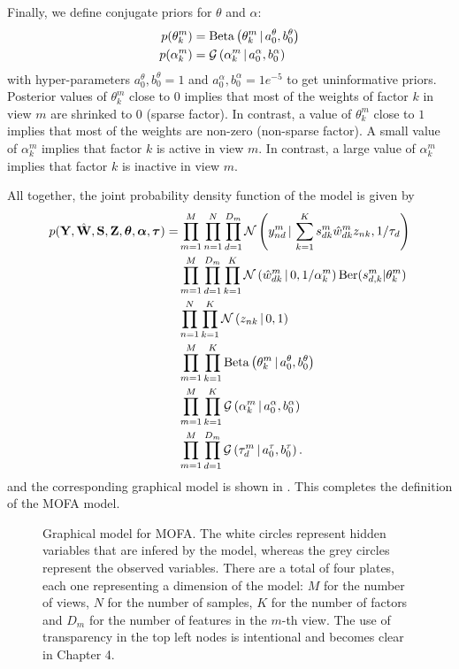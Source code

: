 Finally, we define conjugate priors for $\theta$ and $\alpha$:
\begin{align}
	p(\theta_k^m) &= \text{Beta}\left(\theta_k^m \,|\, a_0^\theta,b_0^\theta\right)\\
	p(\alpha_k^m) &= \mathcal{G}\left(\alpha_k^m \,|\, a_0^\alpha, b_0^\alpha\right)
\end{align}
with hyper-parameters $a_0^\theta,b_0^\theta =1$ and $a_0^\alpha, b_0^\alpha=1e^{-5}$ to get uninformative priors. Posterior values of $\theta_k^m$ close to $0$ implies that most of the weights of factor $k$ in view $m$ are shrinked to $0$ (sparse factor). In contrast, a value of $\theta_k^m$ close to $1$ implies that most of the weights are non-zero (non-sparse factor). A small value of $\alpha_k^m$ implies that factor $k$ is active in view $m$. In contrast, a large value of $\alpha_k^m$ implies that factor $k$ is inactive in view $m$.

All together, the joint probability density function of the model is given by
\begin{align}
	\begin{split}
	p({\bf Y},\hat{{\bf W}},{\bf S},{\bf Z},\mbox{\boldmath $\theta$}, \mbox{\boldmath $\alpha$}, \mbox{\boldmath $\tau$})  = &\prod_{m=1}^{M} \prod_{n=1}^{N} \prod_{d=1}^{D_m} \mathcal{N}\left(y_{nd}^m \,|\, \sum_{k=1}^{K} s_{dk}^m \hat{w}_{dk}^m z_{nk},1/\tau_d\right) \\
	& \prod_{m=1}^{M}\prod_{d=1}^{D_m} \prod_{k=1}^{K} \mathcal{N}\left(\hat{w}_{dk}^m \,|\, 0,1/\alpha_k^m\right) \text{Ber}(s_{d,k}^m|\theta_k^m) \\
	& \prod_{n=1}^{N} \prod_{k=1}^{K} \mathcal{N}\left(z_{nk} \,|\, 0,1\right) \\
	& \prod_{m=1}^{M} \prod_{k=1}^{K} \text{Beta}\left(\theta_k^m \,|\, a_0^\theta,b_0^\theta\right) \\
	& \prod_{m=1}^{M} \prod_{k=1}^{K} \mathcal{G}\left(\alpha_k^m \,|\, a_0^\alpha, b_0^\alpha\right) \\
	& \prod_{m=1}^{M} \prod_{d=1}^{D_m} \mathcal{G}\left(\tau_d^m \,|\, a_0^\tau,b_0^\tau\right).
	\label{likelihood}
	\end{split}
\end{align}
and the corresponding graphical model is shown in . This completes the definition of the MOFA model.

\begin{figure}[H]
	\centering
	
	\caption{Graphical model for MOFA. The white circles represent hidden variables that are infered by the model, whereas the grey circles represent the observed variables. There are a total of four plates, each one representing a dimension of the model: $M$ for the number of views, $N$ for the number of samples, $K$ for the number of factors and $D_m$ for the number of features in the $m$-th view. The use of transparency in the top left nodes is intentional and becomes clear in Chapter 4.}
	\label{fig:MOFA_graphical_model}
\end{figure}

